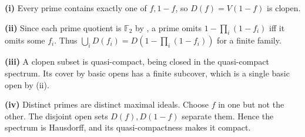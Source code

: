 \textbf{(i)} Every prime contains exactly one of $f,1-f$, so $D(f)=V(1-f)$ is clopen.

\textbf{(ii)} Since each prime quotient is $\mathbb F_2$ by , a prime omits $1-\prod_i(1-f_i)$ iff it omits some $f_i$. Thus $\bigcup_iD(f_i)=D(1-\prod_i(1-f_i))$ for a finite family.

\textbf{(iii)} A clopen subset is quasi-compact, being closed in the quasi-compact spectrum. Its cover by basic opens has a finite subcover, which is a single basic open by (ii).

\textbf{(iv)} Distinct primes are distinct maximal ideals. Choose $f$ in one but not the other. The disjoint open sets $D(f),D(1-f)$ separate them. Hence the spectrum is Hausdorff, and its quasi-compactness makes it compact.
